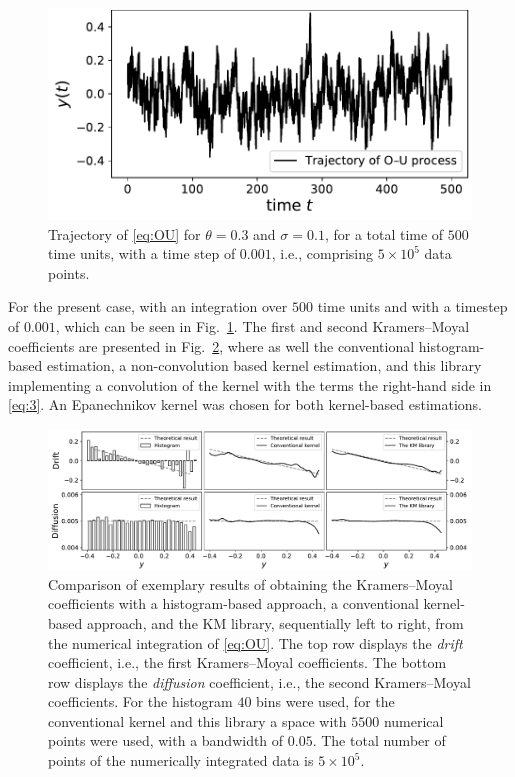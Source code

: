 \documentclass[showpacs,showkeys,10pt,onecolumn,superscriptaddress,notitlepage]{revtex4-1}
\begin{document}
\begin{figure}[H]
    \centering
    \includegraphics[width=0.45\linewidth]{Fig_1.pdf}
    \caption{Trajectory of \eqref{eq:OU} for $\theta = 0.3$ and $\sigma=0.1$, for a total time of $500$ time units, with a time step of $0.001$, i.e., comprising $5\times10^5$ data points.}\label{fig:1}
\end{figure}

For the present case, with an integration over $500$ time units and with a timestep of $0.001$, which can be seen in Fig.~\ref{fig:1}.
The first and second Kramers--Moyal coefficients are presented in Fig.~\ref{fig:2}, where as well the conventional histogram-based estimation, a non-convolution based kernel estimation, and this library implementing a convolution of the kernel with the terms the right-hand side in \eqref{eq:3}.
An Epanechnikov kernel was chosen for both kernel-based estimations.

\begin{figure}[H]
    \centering
    \includegraphics[width=0.85\linewidth]{Fig_2.pdf}
    \caption{Comparison of exemplary results of obtaining the Kramers--Moyal coefficients with a histogram-based approach, a conventional kernel-based approach, and the KM library, sequentially left to right, from the numerical integration of \eqref{eq:OU}.
    The top row displays the \textit{drift} coefficient, i.e., the first Kramers--Moyal coefficients.
    The bottom row displays the \textit{diffusion} coefficient, i.e., the second Kramers--Moyal coefficients.
    For the histogram $40$ bins were used, for the conventional kernel and this library a space with $5500$ numerical points were used, with a bandwidth of $0.05$.
    The total number of points of the numerically integrated data is $5\times10^5$.}\label{fig:2}
\end{figure}
\end{document}
